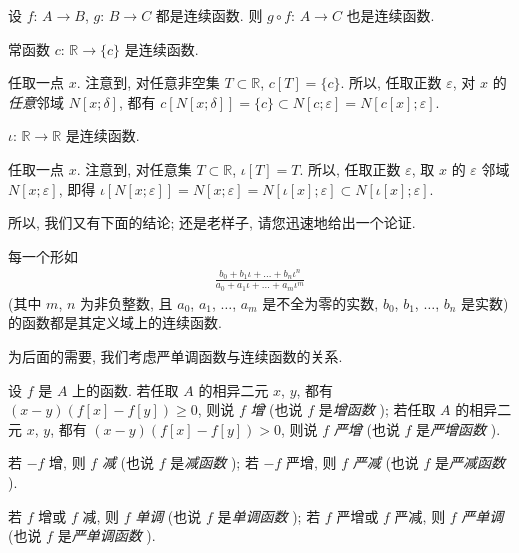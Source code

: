 \begin{theorem}
    设 $f$: $A \to B$, $g$: $B \to C$ 都是连续函数.
    则 $g \circ f$: $A \to C$ 也是连续函数.
\end{theorem}

\begin{example}
    常函数 $c$: $\mathbb{R} \to \{ c \}$ 是连续函数.

    任取一点 $x$.
    注意到, 对任意非空集 $T \subset \mathbb{R}$,
    $c[T] = \{ c \}$.
    所以, 任取正数 $\varepsilon$,
    对 $x$ 的\emph{任意}邻域 $N[x; \delta]$,
    都有
    $c[N[x; \delta]] = \{ c \} \subset N[c; \varepsilon] = N[c[x]; \varepsilon]$.
\end{example}

\begin{example}
    $\iota$: $\mathbb{R} \to \mathbb{R}$ 是连续函数.

    任取一点 $x$.
    注意到, 对任意集 $T \subset \mathbb{R}$, $\iota[T] = T$.
    所以, 任取正数 $\varepsilon$,
    取 $x$ 的 $\varepsilon$ 邻域 $N[x; \varepsilon]$,
    即得
    $\iota[N[x; \varepsilon]] = N[x; \varepsilon] = N[\iota[x]; \varepsilon] \subset N[\iota[x]; \varepsilon]$.
\end{example}

所以, 我们又有下面的结论;
还是老样子, 请您迅速地给出一个论证.

\begin{theorem}
    每一个形如
    \begin{align*}
        \frac{b_0 + b_1 \iota + \dots + b_n \iota^n}{a_0 + a_1 \iota + \dots + a_m \iota^m}
    \end{align*}
    (其中 $m$, $n$ 为非负整数,
    且 $a_0$, $a_1$, $\dots$, $a_m$ 是不全为零的实数,
    $b_0$, $b_1$, $\dots$, $b_n$ 是实数)
    的函数都是其定义域上的连续函数.
\end{theorem}

为后面的需要, 我们考虑严单调函数与连续函数的关系.

\begin{definition}
    设 $f$ 是 $A$ 上的函数.
    若任取 $A$ 的相异二元 $x$, $y$,
    都有 $(x - y)(f[x] - f[y]) \geq 0$,
    则说 $f$ \emph{增}
    (也说 $f$ 是\emph{增函数}%
    );
    若任取 $A$ 的相异二元 $x$, $y$,
    都有 $(x - y)(f[x] - f[y]) > 0$,
    则说 $f$ \emph{严增}
    (也说 $f$ 是\emph{严增函数}%
    ).

    若 $-f$ 增, 则 $f$ \emph{减}
    (也说 $f$ 是\emph{减函数}%
    );
    若 $-f$ 严增, 则 $f$ \emph{严减}
    (也说 $f$ 是\emph{严减函数}%
    ).

    若 $f$ 增或 $f$ 减,
    则 $f$ \emph{单调}
    (也说 $f$ 是\emph{单调函数}%
    );
    若 $f$ 严增或 $f$ 严减,
    则 $f$ \emph{严单调}
    (也说 $f$ 是\emph{严单调函数}%
    ).
\end{definition}


